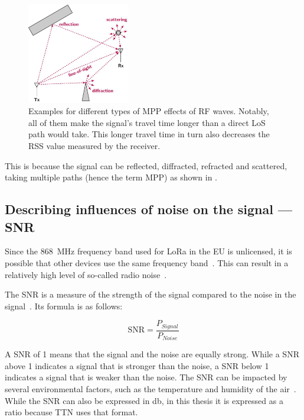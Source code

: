 \begin{figure}[htbp]
    \centering
    \includegraphics[width=0.4\textwidth]{pictures/diagrams_figures/multipath_propagation.jpg}
    \caption[Examples for different types of \acl{MPP} effects of \acl{RF} waves.]{
        Examples for different types of \acf{MPP} effects of \ac{RF} waves.
        Notably, all of them make the signal's travel time longer than a direct \ac{LoS} path would take.
        This longer travel time in turn also decreases the \ac{RSS} value measured by the receiver.~\protect\cite{milosevic_key_2017}
    }\label{pic:figure_multipath_propagation}
\end{figure}

This is because the signal can be reflected, diffracted, refracted and scattered, taking multiple paths (hence the term \acl{MPP}) as shown in .

\subsection{Describing influences of noise on the signal — \acf{SNR}}\label{sec:background-snr}

Since the \SI{868}{\mega\hertz} frequency band used for \ac{LoRa} in the \ac{EU} is unlicensed, it is possible that other devices use the same frequency band~\cite{etsi_etsi_2012}.
This can result in a relatively high level of so-called radio noise~\cite[p. 6]{fujdiak_insights_2022}.

The \acf{SNR} is a measure of the strength of the signal compared to the noise in the signal~\cite{johnson_signal--noise_2006}.
Its formula is as follows:

\begin{equation}
    \text{SNR} = \frac{P_{Signal}}{P_{Noise}}
\end{equation}

A \ac{SNR} of 1 means that the signal and the noise are equally strong.
While a \ac{SNR} above 1 indicates a signal that is stronger than the noise, a \ac{SNR} below 1 indicates a signal that is weaker than the noise.
The \ac{SNR} can be impacted by several environmental factors, such as the temperature and humidity of the air~\cite{jeftenic_impact_2020}.
While the \ac{SNR} can also be expressed in \si{\decibel}, in this thesis it is expressed as a ratio because \ac{TTN} uses that format.

